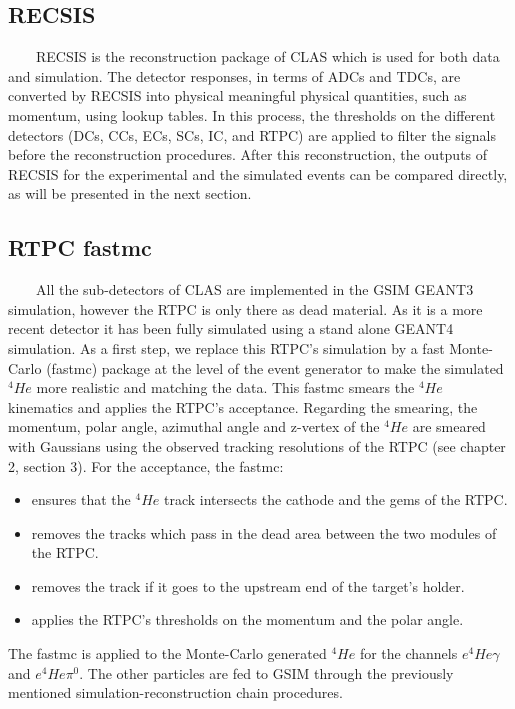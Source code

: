 \subsection{RECSIS}

~~~~RECSIS is the reconstruction package of CLAS which is used for both data 
and simulation. The detector responses, in terms of ADCs and TDCs, are 
converted by RECSIS into physical meaningful physical quantities, such as 
momentum, using lookup tables. In this process, the thresholds on the different 
detectors (DCs, CCs, ECs, SCs, IC, and RTPC) are applied to filter the signals 
before the reconstruction procedures. After this reconstruction, the outputs of 
RECSIS for the experimental and the simulated events can be compared directly, 
as will be presented in the next section.

\subsection{RTPC fastmc}
~~~~All the sub-detectors of CLAS are implemented in the GSIM GEANT3 simulation, 
however the RTPC is only there as dead material. As it is a more recent detector
it has been fully simulated using a stand alone GEANT4 simulation. As a 
first step, we replace this RTPC's simulation by a fast Monte-Carlo (fastmc) 
package at the level of the event generator to make the simulated $^{4}He$ more 
realistic and matching the data. This fastmc smears the $^{4}He$ kinematics and 
applies the RTPC's acceptance. Regarding the smearing, the momentum, polar 
angle, azimuthal angle and z-vertex of the $^{4}He$ are smeared with Gaussians 
using the observed tracking resolutions of the RTPC (see chapter 2, section 3).  
For the acceptance, the fastmc:
\begin{itemize}
\item ensures that the $^{4}He$ track intersects the cathode and the gems of the RTPC.
\item removes the tracks which pass in the dead area between the two modules of the RTPC.
\item removes the track if it goes to the upstream end of the target's holder.
\item applies the RTPC's thresholds on the momentum and the polar angle.
\end{itemize} 

The fastmc is applied to the Monte-Carlo generated 
$^{4}He$ for the channels $e^{4}He\gamma$ and $e^{4}He\pi^{0}$. The other 
particles are fed to GSIM through the previously mentioned 
simulation-reconstruction chain procedures.


